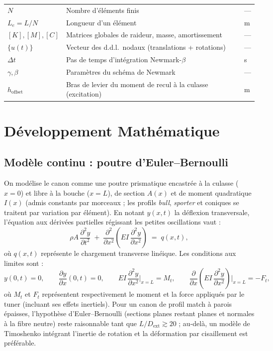 \documentclass[12pt,a4paper]{article}
\begin{document}
\begin{center}
\begin{tabular}{l l l}
			$N$ & Nombre d'éléments finis & --- \\
			$L_e = L/N$ & Longueur d'un élément & m \\
			$[K], [M], [C]$ & Matrices globales de raideur, masse, amortissement & --- \\
			$\{u(t)\}$ & Vecteur des d.d.l.\ nodaux (translations + rotations) & --- \\
			$\Delta t$ & Pas de temps d'intégration Newmark-$\beta$ & s \\
			$\gamma, \beta$ & Paramètres du schéma de Newmark & --- \\
			$h_\text{offset}$ & Bras de levier du moment de recul à la culasse (excitation) & m \\
			\bottomrule
		\end{tabular}
	\end{center}

	\section{Développement Mathématique}
	\label{sec:math}

	\subsection{Modèle continu : poutre d'Euler--Bernoulli}

	On modélise le canon comme une poutre prismatique encastrée à la culasse ($x=0$) et libre à la bouche ($x=L$), de section $A(x)$ et de moment quadratique $I(x)$ (admis constants par morceaux ; les profils \emph{bull}, \emph{sporter} et coniques se traitent par variation par élément). En notant $y(x,t)$ la déflexion transversale, l'équation aux dérivées partielles régissant les petites oscillations vaut :
	\begin{equation}
		\label{eq:EB}
		\rho A \,\frac{\partial^2 y}{\partial t^2} \;+\; \frac{\partial^2}{\partial x^2}\!\left(EI \,\frac{\partial^2 y}{\partial x^2}\right) \;=\; q(x,t),
	\end{equation}
	où $q(x,t)$ représente le chargement transverse linéique. Les conditions aux limites sont :
	\begin{equation*}
		y(0,t) = 0,\qquad \frac{\partial y}{\partial x}(0,t) = 0,\qquad EI\,\frac{\partial^2 y}{\partial x^2}\bigg|_{x=L}\!\! = M_t,\qquad \frac{\partial}{\partial x}\!\left(EI\,\frac{\partial^2 y}{\partial x^2}\right)\bigg|_{x=L}\!\! = -F_t,
	\end{equation*}
	où $M_t$ et $F_t$ représentent respectivement le moment et la force appliqués par le tuner (incluant ses effets inertiels). Pour un canon de profil match à parois épaisses, l'hypothèse d'Euler--Bernoulli (sections planes restant planes et normales à la fibre neutre) reste raisonnable tant que $L/D_\text{ext} \gtrsim 20$ ; au-delà, un modèle de Timoshenko intégrant l'inertie de rotation et la déformation par cisaillement est préférable.
\end{document}
